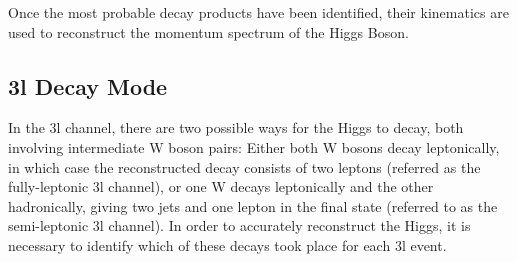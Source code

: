 Once the most probable decay products have been identified, their kinematics are used to reconstruct the momentum spectrum of the Higgs Boson. 

\subsection{3l Decay Mode}
\label{sec:decay3l}

In the 3l channel, there are two possible ways for the Higgs to decay, both involving intermediate W boson pairs: Either both W bosons decay leptonically, in which case the reconstructed decay consists of two leptons (referred as the fully-leptonic 3l channel), or one W decays leptonically and the other hadronically, giving two jets and one lepton in the final state (referred to as the semi-leptonic 3l channel). In order to accurately reconstruct the Higgs, it is necessary to identify which of these decays took place for each 3l event.




